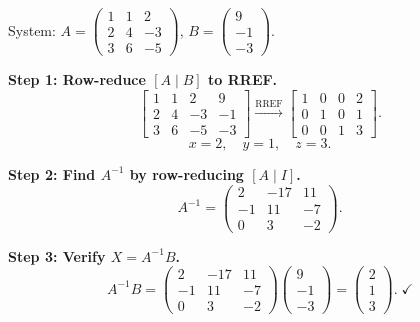 \documentclass[12pt,a3paper]{article}
\begin{document}
\begin{tcolorbox}[enhanced,breakable,colback=cB!4,colframe=cB,
  boxrule=0.8pt,arc=5pt,
  title={\textbf{Answer --- Solve System via RREF; $A^{-1}$; $X=A^{-1}B$}},
  fonttitle=\bfseries\color{white},colbacktitle=cB]

System: $A=\begin{pmatrix}1&1&2\\2&4&-3\\3&6&-5\end{pmatrix}$, $B=\begin{pmatrix}9\\-1\\-3\end{pmatrix}$.

\textbf{Step 1: Row-reduce $[A\mid B]$ to RREF.}
\[
\left[\begin{array}{ccc|c}1&1&2&9\\2&4&-3&-1\\3&6&-5&-3\end{array}\right]
\xrightarrow{\text{RREF}}
\left[\begin{array}{ccc|c}1&0&0&2\\0&1&0&1\\0&0&1&3\end{array}\right].
\]
\[
\boxed{x=2,\quad y=1,\quad z=3.}
\]

\textbf{Step 2: Find $A^{-1}$ by row-reducing $[A\mid I]$.}
\[
A^{-1}=\begin{pmatrix}2&-17&11\\-1&11&-7\\0&3&-2\end{pmatrix}.
\]

\textbf{Step 3: Verify $X=A^{-1}B$.}
\[
A^{-1}B=\begin{pmatrix}2&-17&11\\-1&11&-7\\0&3&-2\end{pmatrix}\begin{pmatrix}9\\-1\\-3\end{pmatrix}=\begin{pmatrix}2\\1\\3\end{pmatrix}.\;\checkmark
\]

\end{tcolorbox}
\end{document}
